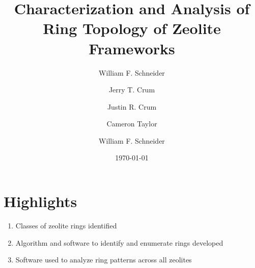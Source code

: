 \documentclass{elsarticle}
\author{William F. Schneider}
\date{\today}
\title{}
\begin{document}
\begin{OPTIONS:}
\end{OPTIONS:}

\title{Characterization and Analysis of Ring Topology of Zeolite Frameworks}
\author[nd]{Jerry T. Crum}
\author[uoa]{Justin R. Crum}
\author[nd]{Cameron Taylor}
\author[nd,ndc]{William F. Schneider}
\address[nd]{Department of Chemical and Biomoledcular Engineering, University of Notre Dame, 250 Nieuwland Science Hall, Notre Dame, IN 46556, USA}
\address[uoa]{Department of Applied Mathematics, University of Arizona, 617 N Santa Rita Ave, Tucson, AZ 85721, USA}
\address[ndc]{Department of Chemistry and Biochemistry, University of Notre Dame, 251 Nieuwland Science Hall, Notre Dame, IN 46556, USA}
\maketitle

\section{Highlights}
\label{sec:org1e12ba5}
\begin{enumerate}
\item Classes of zeolite rings identified
\item Algorithm and software to identify and enumerate rings developed
\item Software used to analyze ring patterns across all zeolites
\end{enumerate}
\end{document}
